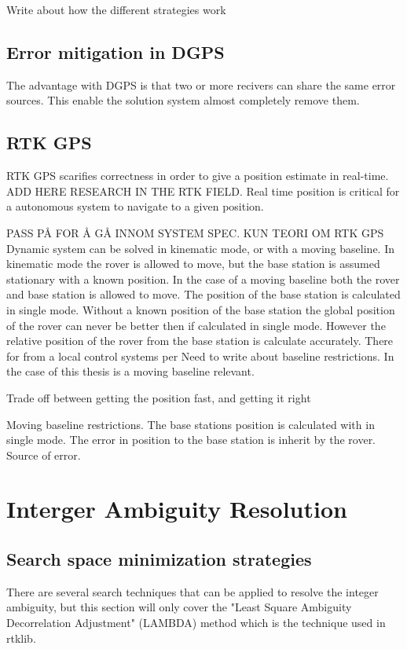 Write about how the different strategies work
\subsection{Error mitigation in DGPS}
The advantage with DGPS is that two or more recivers can share the same error sources. This enable the solution system almost completely remove them.



\subsection{RTK GPS}
RTK GPS scarifies correctness in order to give a position estimate in real-time. ADD HERE RESEARCH IN THE RTK FIELD. Real time position is critical for a autonomous system to navigate to a given position. 


PASS PÅ FOR Å GÅ INNOM SYSTEM SPEC. KUN TEORI OM RTK GPS
Dynamic system can be solved in kinematic mode, or with a moving baseline. In kinematic mode the rover is allowed to move, but the base station is assumed stationary with a known position. In the case of a moving baseline both the rover and base station is allowed to move. The position of the base station is calculated in single mode. Without a known position of the base station the global position of the rover can never be better then if calculated in single mode. However the relative position of the rover from the base station is calculate accurately. There for from a local control systems per
Need to write about baseline restrictions. In the case of this thesis is a moving baseline relevant.

Trade off between getting the position fast, and getting it right 

Moving baseline restrictions. The base stations position is calculated with in single mode. The error in position to the base station is inherit by the rover. Source of error.
\section{Interger Ambiguity Resolution}

\subsection{Search space minimization strategies}
There are several search techniques that can be applied to resolve the integer ambiguity, but this section will only cover the "Least Square Ambiguity Decorrelation Adjustment" (LAMBDA) method which is the technique used in rtklib.


\cleardoublepage